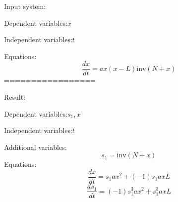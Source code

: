 \documentclass[10pt,a4paper]{article}
\begin{document}
Input system:

Dependent variables:$x$

Independent variables:$t$

Equations:
\begin{dmath*}\frac{dx}{dt} = a  x  \left(x - L\right)  \text{inv}\left(N + x\right)\end{dmath*}
=================

Result:

Dependent variables:$s_{1}, x$

Independent variables:$t$

Additional variables:
\begin{dmath*}s_{1} = \text{inv}\left(N + x\right)\end{dmath*}
Equations:
\begin{dmath*}\frac{dx}{dt} = s_{1}  a  x ^ {2} + \left(-1\right)  s_{1}  a  x  L\end{dmath*}
\begin{dmath*}\frac{ds_{1}}{dt} = \left(-1\right)  s_{1} ^ {3}  a  x ^ {2} + s_{1} ^ {3}  a  x  L\end{dmath*}
\end{document}
